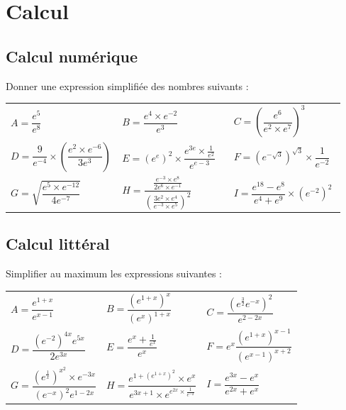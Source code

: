\documentclass[oneside,12pt]{book}          %
\begin{document}
\section{Calcul}


\subsection{Calcul numérique}
Donner une expression simplifiée des nombres suivants :

\renewcommand{\arraystretch}{2.4}
\begin{tabular}{p{0.33\linewidth}p{0.33\linewidth}p{0.33\linewidth}}
    $A = \dfrac{e^5}{e^8}$ & $B = \dfrac{e^4\times e^{-2}}{e^3}$ & $C = \left(\dfrac{e^6}{e^2\times e^7}\right)^3$\\
    $D = \dfrac{9}{e^{-4}}\times\left(\dfrac{e^2\times e^{-6}}{3e^3}\right)$ & $E = \left(e^e\right)^2\times\dfrac{e^{3e}\times\frac{1}{e^2}}{e^{e-3}}$ & $F = \left(e^{-\sqrt{3}}\right)^{\sqrt{3}}\times\dfrac{1}{e^{-2}}$\\
    $G = \sqrt{\dfrac{e^5\times e^{-12}}{4e^{-7}}}$ & $H = \dfrac{\frac{e^{-3}\times e^8}{2e^6\times e^{-1}}}{\left(\frac{3e^2\times e^4}{e^{-3}\times e^5}\right)^2}$ & $I = \dfrac{e^{18}-e^{8}}{e^4+e^9}\times \left(e^{-2}\right)^2$
\end{tabular}



\subsection{Calcul littéral}
Simplifier au maximum les expressions suivantes :

\renewcommand{\arraystretch}{2.4}
\begin{tabular}{p{} p{} p{}}\large

    $A=\dfrac{e^{1+x}}{e^{x-1}}$ & $B=\dfrac{(e^{1+x})^{x}}{(e^{x})^{1+x}}$ & $C=\dfrac{(e^{\frac{3}{2}}e^{-x})^{2}}{e^{2-2x}}$ \\
    $D=\dfrac{(e^{-2})^{4x}e^{5x}}{2e^{3x}} $ & $E=\dfrac{e^{x}+\frac{1}{e^{x}}}{e^{x}} $ & $F=e^{x}\dfrac{(e^{1+x})^{x-1}}{(e^{x-1})^{x+2}} $ \\
    $G=\dfrac{\left(e^{\frac{1}{x}}\right)^{x^{2}}\times e^{-3x}}{(e^{-x})^{2}e^{1-2x}}$ & $H=\dfrac{e^{1+(e^{1+x})^{2}}\times e^{x}}{e^{3x+1}\times e^{e^{2x}\times\frac{1}{e^{-2}}}}$ & $I=\dfrac{e^{3x}-e^{x}}{e^{2x}+e^{x}} $
\end{tabular}
\end{document}

